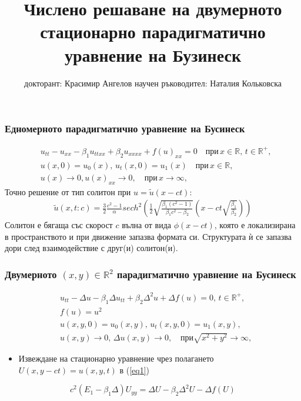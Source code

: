 \documentclass{beamer}
\title{Числено решаване на двумерното стационарно парадигматично уравнение на Бузинеск}
\author{докторант: Красимир Ангелов 
\newline \newline научен ръководител: Наталия Кольковска}
\newcommand{\RR}{\mathbb{R}}
\newcommand{\rf}[1]{(\ref{#1})}
\begin{document}
\begin{frame}
\titlepage
\end{frame}


\begin{frame}
\frametitle{ Едномерното парадигматично уравнение на Бусинеск }
\begin{align}
&u_{tt} - u_{xx} -\beta_1  u_{ttxx} +\beta_2 u_{xxxx} + f(u)_{xx}=0   \quad \text{при} \,  x \in \RR, \, t\in\RR^+,\label{eq1D}
\\ \nonumber &u(x,0)=u_0(x), \, u_t(x,0)=u_1(x)   \quad\text{при} \, x \in \RR,
\\  &u(x) \rightarrow 0,  u(x)_{xx} \rightarrow 0 ,  \quad \text{при} \, x \rightarrow \infty, \label{eq1d1}
\end{align}
Точно решение от тип солитон при $u =\tilde u(x-ct)$:
\begin{align}
\tilde u(x,t:c) = \frac{3}{2} \frac{c^2-1}{\alpha}sech^2 \left( \frac{1}{2}  \sqrt{ \frac{\beta_1 (c^2-1)}{\beta_1 c^2-\beta_2}} (x-c t \sqrt{\frac{\beta_1}{\beta_2}} ) \right)
\end{align}
Солитон е бягаща със скорост $c$ вълна от вида $\phi(x-ct)$, която е локализирана в пространството и при движение запазва формата си. Структурата ѝ се запазва дори след взаимодействие с друг(и) солитон(и).
\end{frame}

\begin{frame}
\frametitle{ Двумерното $(x,y) \in \RR^2$ парадигматично уравнение на Бусинеск }
\begin{align}
&u_{tt} - \Delta u -\beta_1  \Delta u_{tt} +\beta_2 \Delta ^2 u + \Delta f(u)=0, \, t\in\RR^+,\label{eq1}
\\
&f(u) = u^2 \nonumber \\  \nonumber &u(x,y,0)=u_0(x,y), \, u_t(x,y,0)=u_1(x,y)  , 
\\  &u(x,y) \rightarrow 0, \,  \Delta u(x,y) \rightarrow 0 ,  \quad \text{при} \sqrt{x^2 + y^2} \rightarrow \infty, \label{eq11} 
\end{align}
\begin{itemize}
  \item Извеждане на {\color{red}стационарно} уравнение чрез полагането $U(x,y-ct)=u(x,y,t)$ в \rf{eq1}
\end{itemize}
\color{red}
\begin{equation}
c^2 (E_1-\beta_1 \Delta) U_{yy} = \Delta U -\beta_2 \Delta^2 U - \Delta f(U)
\end{equation}

\end{frame}
\end{document}
